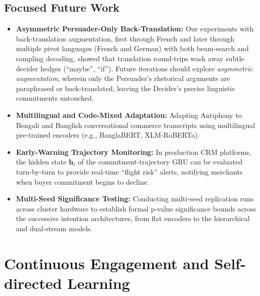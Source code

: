 \subsection{Focused Future Work}
\begin{itemize}
  \item \textbf{Asymmetric Persuader-Only Back-Translation:} Our experiments with back-translation augmentation, first through French and later through multiple pivot languages (French and German) with both beam-search and sampling decoding, showed that translation round-trips wash away subtle decider hedges (``maybe'', ``if''). Future iterations should explore \textit{asymmetric augmentation}, wherein only the Persuader's rhetorical arguments are paraphrased or back-translated, leaving the Decider's precise linguistic commitments untouched.
  \item \textbf{Multilingual and Code-Mixed Adaptation:} Adapting Antiphony to Bengali and Banglish conversational commerce transcripts using multilingual pre-trained encoders (e.g., BanglaBERT, XLM-RoBERTa).
  \item \textbf{Early-Warning Trajectory Monitoring:} In production CRM platforms, the hidden state $\mathbf{h}_t$ of the commitment-trajectory GRU can be evaluated turn-by-turn to provide real-time ``flight risk'' alerts, notifying merchants when buyer commitment begins to decline.
  \item \textbf{Multi-Seed Significance Testing:} Conducting multi-seed replication runs across cluster hardware to establish formal p-value significance bounds across the successive intention architectures, from flat encoders to the hierarchical and dual-stream models.
\end{itemize}

\section{Continuous Engagement and Self-directed Learning}
\label{sec:lessons}

